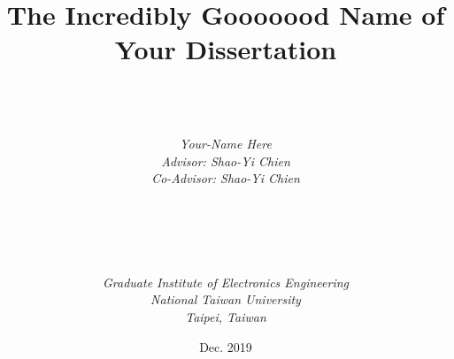 \documentclass[a4paper, 12pt, twoside, openright]{mydissertation}
\begin{document}

\title{\textbf{The Incredibly Gooooood Name of Your Dissertation}}

\author{ \\  \\ \\
{\it Your-Name Here}\\
{\it Advisor: Shao-Yi Chien}\\
{\it Co-Advisor: Shao-Yi Chien} \\ \\ \\ \\  \\ \\
{\it Graduate Institute of Electronics Engineering}\\
{\it National Taiwan University} \\
{\it Taipei, Taiwan}\\ }

{\date{Dec. 2019}}

\maketitle

\frontmatter

\tableofcontents
\listoffigures
\listoftables


\mainmatter







\end{document}
